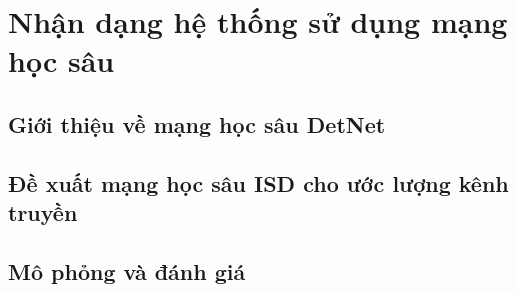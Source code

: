 \clearpage
{}

\setcounter{chapter}{2}
\chapter[NHẬN DẠNG HỆ THỐNG SỬ DỤNG MẠNG HỌC SÂU]{Nhận dạng hệ thống sử dụng mạng học sâu}
\label{sec:ML}

\section{Giới thiệu về mạng học sâu DetNet}

\section{Đề xuất mạng học sâu ISD cho ước lượng kênh truyền}

\section{Mô phỏng và đánh giá}